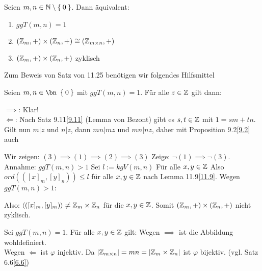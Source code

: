 \documentclass{../../meta/tudscript}
\begin{document}
\setcounter{section}{11}
\setcounter{subsection}{24}
        Seien $m, n \in \mathbb{N} \setminus \Set{0}$. Dann äquivalent:
        \begin{enumerate}
            \item $ggT (m,n) = 1$
            \item $(\mathbb{Z}_m, +) \times (\mathbb{Z}_n, +) \cong (\mathbb{Z}_{m \times n}, +)$
            \item $(\mathbb{Z}_m, +) \times (\mathbb{Z}_n, +)$ zyklisch
        \end{enumerate}
        
        Zum Beweis von Satz von 11.25 benötigen wir folgendes Hilfsmittel
       
            Seien $m, n \in \bn \ \Set{0}$ mit $ggT (m,n) = 1$. Für alle $z \in \mathbb{Z}$ gilt dann:
            
                $\implies$: Klar! \\
                $\Leftarrow$: Nach Satz 9.11\ref{9.11} (Lemma von Bezont) gibt es $s, t \in \mathbb{Z}$ mit $1 = sm + tn$.
                Gilt nun $m|z$ und $n|z$, dann $mn|mz$ und $mn|nz$, daher mit Proposition 9.2\ref{9.2} auch 
        
            Wir zeigen: $(3) \implies (1) \implies (2) \implies (3)$
                Zeige: $\neg (1) \implies \neg (3)$. Annahme: $ggT (m,n) > 1$
                Sei $l := kgV (m,n)$ Für alle $x,y \in \mathbb{Z}$
                Also $ord (([x]_m, [y]_n)) \leq l$ für alle $x,y \in \mathbb{Z}$ nach Lemma 11.9\ref{11.9}. Wegen $ggT (m,n) > 1$:
                
                Also: $\langle ([x]_m, [y]_m) \rangle \neq \mathbb{Z}_m \times \mathbb{Z}_n$ für die $x,y \in \mathbb{Z}$.
                Somit $(\mathbb{Z}_m, +) \times (\mathbb{Z}_n, +)$ nicht zyklisch.

                Sei $ggT (m,n) = 1$. Für alle $x,y \in \mathbb{Z}$ gilt:
                Wegen $\implies$ ist die Abbildung
                wohldefiniert.\\
                Wegen $\Leftarrow$ ist $\varphi$ injektiv. Da $|\mathbb{Z}_{m \times n}| = mn = |\mathbb{Z}_m \times \mathbb{Z}_n|$ ist $\varphi$ bijektiv. (vgl. Satz 6.6\ref{6.6})
\end{document}
